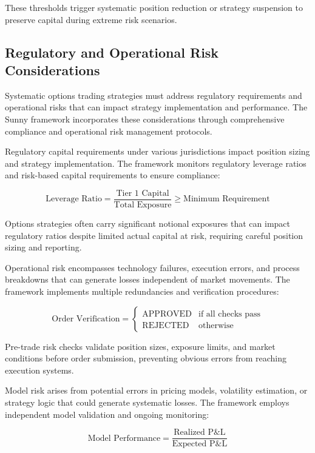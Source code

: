 \documentclass[
  american,
  11pt,
  11pt,
  letterpaper,
  onecolumn]{article}
\begin{document}
These thresholds trigger systematic position reduction or strategy
suspension to preserve capital during extreme risk scenarios.

\subsection{Regulatory and Operational Risk
Considerations}\label{regulatory-and-operational-risk-considerations}

Systematic options trading strategies must address regulatory
requirements and operational risks that can impact strategy
implementation and performance. The Sunny framework incorporates these
considerations through comprehensive compliance and operational risk
management protocols.

Regulatory capital requirements under various jurisdictions impact
position sizing and strategy implementation. The framework monitors
regulatory leverage ratios and risk-based capital requirements to ensure
compliance:

\[\text{Leverage Ratio} = \frac{\text{Tier 1 Capital}}{\text{Total Exposure}} \geq \text{Minimum Requirement}\]

Options strategies often carry significant notional exposures that can
impact regulatory ratios despite limited actual capital at risk,
requiring careful position sizing and reporting.

Operational risk encompasses technology failures, execution errors, and
process breakdowns that can generate losses independent of market
movements. The framework implements multiple redundancies and
verification procedures:

\[\text{Order Verification} = \begin{cases}
\text{APPROVED} & \text{if all checks pass} \\
\text{REJECTED} & \text{otherwise}
\end{cases}\]

Pre-trade risk checks validate position sizes, exposure limits, and
market conditions before order submission, preventing obvious errors
from reaching execution systems.

Model risk arises from potential errors in pricing models, volatility
estimation, or strategy logic that could generate systematic losses. The
framework employs independent model validation and ongoing monitoring:

\[\text{Model Performance} = \frac{\text{Realized P\&L}}{\text{Expected P\&L}}\]
\end{document}
